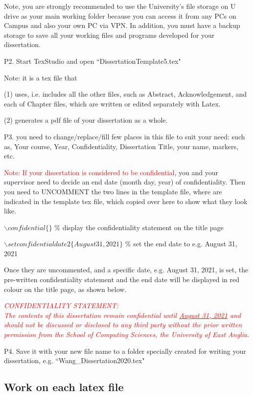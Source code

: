 Note, you are strongly recommended to use the University's file storage on U drive as your main working folder because you can access it from any PCs on Campus and also your own PC via VPN. In addition, you must have a backup storage to save all your working files and programs developed for your dissertation.     

P2. Start TexStudio and open ``DissertationTemplate5.tex" 

Note: it is a tex file that 

(1) uses, i.e. includes all the other files, such as Abstract, Acknowledgement, and each of Chapter files, which are written or edited separately with Latex.
 
(2) generates a pdf file of your dissertation as a whole.         
 
P3. you need to change/replace/fill few places in this file to suit your need:
 		such as, Your course, Year, Confidentiality, Dissertation Title, your name, markers, etc.

\textcolor{red}
{Note: If your dissertation is considered to be confidential}, you and your supervisor need to decide an end date (month day, year) of confidentiality. Then you need to UNCOMMENT the two lines in the template file, where are indicated in the template tex file, which copied over here to show what they look like. 

 $\backslash confidential\{\}$   	\% display the confidentiality statement on the title page  
 
 $\backslash setconfidentialdate2\{August 31, 2021\} $	\% set the end date to e.g. August 31, 2021

Once they are uncommented, and a specific date, e.g. August 31, 2021, is set, the pre-written confidentiality statement and the end date will be displayed in red colour on the title page, as shown below.
  
\textcolor {red} {	
	{\emph{CONFIDENTIALITY STATEMENT:\\ 
		The contents of this dissertation remain confidential until \underline{August 31, 2021}
		and should not be discussed or disclosed to any third party without the prior written permission 
		from the School of Computing Sciences, the University of East Anglia.}}}


P4. Save it with your new file name to a folder specially created for writing your dissertation, e.g. ``Wang\_Dissertation2020.tex" 


\subsection{Work on each latex file}
		
